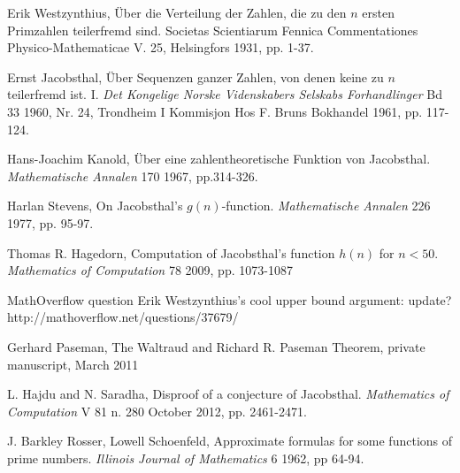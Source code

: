 \documentclass[12pt,leqno]{article}
\begin{document}
\begin{thebibliography}{9}

  Erik Westzynthius,
  \"{U}ber die Verteilung der Zahlen, die zu den $n$ ersten Primzahlen teilerfremd sind.  
  Societas Scientiarum Fennica Commentationes Physico-Mathematicae V. 25, 
  Helsingfors 1931, 
  pp. 1-37.

  Ernst Jacobsthal,
  \"{U}ber Sequenzen ganzer Zahlen, von denen keine zu $n$ teilerfremd ist. I.
  \textit{Det Kongelige Norske Videnskabers Selskabs Forhandlinger} Bd 33 1960, Nr. 24,
  Trondheim I Kommisjon Hos F. Bruns Bokhandel 1961, 
  pp. 117-124.

  Hans-Joachim Kanold, 
  \"{U}ber eine zahlentheoretische Funktion von Jacobsthal.
  \textit{Mathematische Annalen} 170 1967,
  pp.314-326.

  Harlan Stevens, 
  On Jacobsthal's $g(n)$-function.
  \textit{Mathematische Annalen} 226 1977,
  pp. 95-97.

  Thomas R. Hagedorn,
  Computation of Jacobsthal's function $h(n)$ for $n \lt 50$.
  \textit{Mathematics of Computation} 78 2009,
  pp. 1073-1087 

  MathOverflow question 
  Erik Westzynthius's cool upper bound argument: update?
  http://mathoverflow.net/questions/37679/

  Gerhard Paseman, 
  The Waltraud and Richard R. Paseman Theorem, 
  private manuscript, March 2011

  L. Hajdu and N. Saradha, 
  Disproof of a conjecture of Jacobsthal.
  \textit{Mathematics of Computation} V 81 n. 280 October 2012,
  pp. 2461-2471.

  J. Barkley Rosser, Lowell Schoenfeld,
  Approximate formulas for some functions of prime numbers.
  \textit{Illinois Journal of Mathematics} 6 1962, 
  pp 64-94.

\end{thebibliography}
\end{document}
